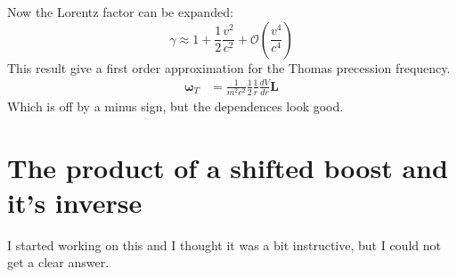 \documentclass[12pt,a4]{article}
\begin{document}
\begin{enumerate}
\begin{enumerate}
        Now the Lorentz factor can be expanded:
        \begin{equation*}
          \gamma \approx 1 + \frac{1}{2} \frac{v^2}{c^2} + \mathcal{O}\left(\frac{v^4}{c^4}\right)
        \end{equation*}
        This result give a first order approximation for the Thomas precession frequency.
        \begin{align*}
          \boldsymbol{\omega}_T &= \frac{1}{m^2c^2}\frac{1}{2}\frac{1}{r}  \frac{d V}{dr} \mathbf{L} 
        \end{align*}
        Which is off by a minus sign, but the dependences look good.
    \end{enumerate}
\end{enumerate}
\appendix
\section{The product of a shifted boost and it's inverse}

I started working on this and I thought it was a bit instructive, but I could not get a clear answer.
\end{document}
